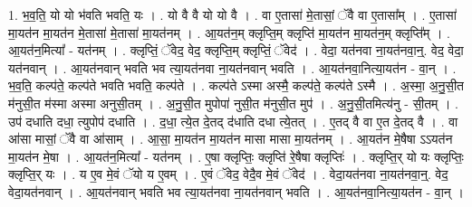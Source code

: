 \documentclass[17pt]{extarticle}
\begin{document}
1. भ॒व॒ति॒ यो यो भ॑वति भवति॒ यः । . यो वै वै यो यो वै । . वा ए॒तासा॑ मे॒तासां॒ ॅवै वा ए॒तासा᳚म् । . ए॒तासा॑ मा॒यत॑न मा॒यत॑न मे॒तासा॑ मे॒तासा॑ मा॒यत॑नम् । . आ॒यत॑न॒म् क्लृप्ति॒म् क्लृप्ति॑ मा॒यत॑न मा॒यत॑न॒म् क्लृप्ति᳚म् । . आ॒यत॑न॒मित्या᳚ - यत॑नम् । . क्लृप्तिं॒ ॅवेद॒ वेद॒ क्लृप्ति॒म् क्लृप्तिं॒ ॅवेद॑ । . वेदा॒ यत॑नवा ना॒यत॑नवा॒न्॒. वेद॒ वेदा॒ यत॑नवान् । . आ॒यत॑नवान् भवति भव त्या॒यत॑नवा ना॒यत॑नवान् भवति । . आ॒यत॑नवा॒नित्या॒यत॑न - वा॒न् । . भ॒व॒ति॒ कल्प॑ते॒ कल्प॑ते भवति भवति॒ कल्प॑ते । . कल्प॑ते ऽस्मा अस्मै॒ कल्प॑ते॒ कल्प॑ते ऽस्मै । . अ॒स्मा॒ अ॒नु॒सी॒त म॑नुसी॒त म॑स्मा अस्मा अनुसी॒तम् । . अ॒नु॒सी॒त मुपोपा॑ नुसी॒त म॑नुसी॒त मुप॑ । . अ॒नु॒सी॒तमित्य॑नु - सी॒तम् । . उप॑ दधाति दधा॒ त्युपोप॑ दधाति । . द॒धा॒ त्ये॒त दे॒तद् द॑धाति दधा त्ये॒तत् । . ए॒तद् वै वा ए॒त दे॒तद् वै । . वा आ॑सा मासां॒ ॅवै वा आ॑साम् । . आ॒सा॒ मा॒यत॑न मा॒यत॑न मासा मासा मा॒यत॑नम् । . आ॒यत॑न मे॒षैषा ऽऽयत॑न मा॒यत॑न मे॒षा । . आ॒यत॑न॒मित्या᳚ - यत॑नम् । . ए॒षा क्लृप्तिः॒ क्लृप्ति॑ रे॒षैषा क्लृप्तिः॑ । . क्लृप्ति॒र् यो यः क्लृप्तिः॒ क्लृप्ति॒र् यः । . य ए॒व मे॒वं ॅयो य ए॒वम् । . ए॒वं ॅवेद॒ वेदै॒व मे॒वं ॅवेद॑ । . वेदा॒यत॑नवा ना॒यत॑नवा॒न्॒. वेद॒ वेदा॒यत॑नवान् । . आ॒यत॑नवान् भवति भव त्या॒यत॑नवा ना॒यत॑नवान् भवति । . आ॒यत॑नवा॒नित्या॒यत॑न - वा॒न् । \newline
\end{document}
